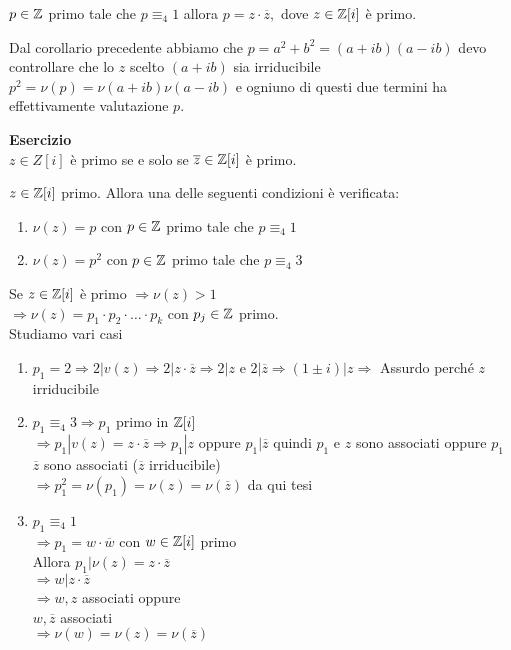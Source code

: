 \documentclass[12px]{article}
\begin{document}
 \begin{coro}
	 $p\in\mathbb{Z}$ primo tale che  $p\equiv_4 1$ allora $p = z\cdot \overline z,$ dove $z\in\mathbb{Z}[i]$ è primo.
 \end{coro}
 \begin{dimo}
 	Dal corollario precedente abbiamo che $p = a^2 + b^2 = (a + ib)(a-ib)$ devo controllare che lo  $z $ scelto $(a + ib)$ sia irriducibile\\
	 $p^2 = \nu(p) = \nu(a + ib)\nu(a -ib)$ e ogniuno di questi due termini ha effettivamente valutazione  $p$.
 \end{dimo}
 \textbf{Esercizio}\\
 $z\in Z[i]$ è primo  se e solo se $\overline z\in\mathbb{Z}[i]$ è  primo.
 \newpage
 \begin{teo}
	 $z\in \mathbb{Z}[i]$ primo. Allora una delle seguenti condizioni è verificata:
	 \begin{enumerate}
		 \item $\nu(z) = p$ con  $p\in\mathbb{Z}$ primo tale che  $p\equiv_4 1$  
		 \item $\nu(z) = p^2$ con $p\in\mathbb{Z}$ primo tale che $p\equiv_4 3$
	 \end{enumerate}
 \end{teo}
 \begin{dimo}
	 Se $z\in \mathbb{Z}[i]$ è primo  $ \Rightarrow \nu(z) > 1$ \\
	 $  \Rightarrow \nu(z) = p_1\cdot p_2\cdot\ldots\cdot p_k$ con $p_j\in\mathbb{Z}$ primo.\\
	 Studiamo vari casi
	  \begin{enumerate}
		  \item $p_1 = 2 \Rightarrow  2 | v(z) \Rightarrow 2 | z\cdot \overline z \Rightarrow 2 | z$ e $2| \overline z \Rightarrow (1 \pm i)|z \Rightarrow $  Assurdo perché $z$ irriducibile
		  \item $p_1 \equiv_4 3 \Rightarrow p_1$  primo in $\mathbb{Z}[i]$\\
			   $ \Rightarrow p_1 | v(z) = z\cdot \overline z \Rightarrow  p_1 | z$ oppure $p_1 | \overline z$ quindi $ p_1$ e $z$ sono associati oppure  $p_1$ $\overline z$ sono associati ($\overline z$ irriducibile)\\
			   $ \Rightarrow p_1^2  = \nu(p_1) = \nu(z) = \nu(\overline z)$ da qui tesi
		   \item $p_1 \equiv_4 1$\\
			   $ \Rightarrow p_1 = w\cdot \overline w $ con $w\in\mathbb{Z}[i]$ primo\\
			   Allora  $p_1 | \nu(z) = z\cdot \overline z$\\
			   $ \Rightarrow w | z \cdot \overline z$ \\
			   $ \Rightarrow w,z$ associati oppure\\
			   $w,\overline z$ associati\\
			    $ \Rightarrow \nu(w) = \nu(z) = \nu (\overline z)$ 
	 \end{enumerate}
 \end{dimo}
\end{document}
